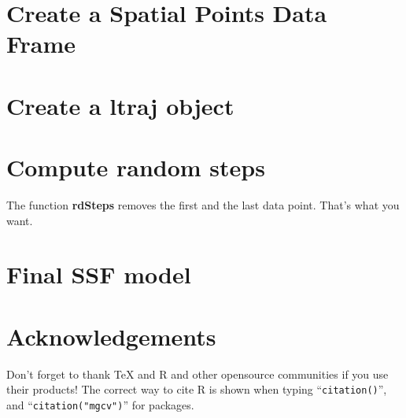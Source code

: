 \documentclass[11pt, a4paper]{article} %
\begin{document}
\section{Create a Spatial Points Data Frame}%

\section{Create a ltraj object}%
 

\section{Compute random steps}

The function \textbf{rdSteps} removes the first and the last data point. That's what you want. 

\section{Final SSF model}


\section{Acknowledgements}
Don't forget to thank TeX and R and other opensource communities if you use their products! The correct way to cite R is shown when typing ``\texttt{citation()}'', and ``\texttt{citation("mgcv")}'' for packages.
\end{document}
